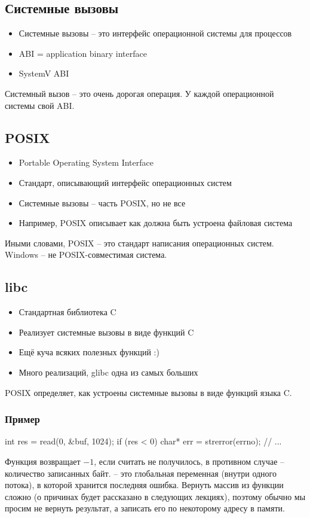     \subsection{Системные вызовы}
    \begin{itemize}
      \item Системные вызовы -- это интерфейс операционной системы для процессов
      \item ABI = application binary interface
      \item SystemV ABI
    \end{itemize}
    Системный вызов -- это очень дорогая операция. У каждой операционной системы свой ABI.
    
    \subsection{POSIX}
    \begin{itemize}
      \item Portable Operating System Interface
      \item Стандарт, описывающий интерфейс операционных систем
      \item Системные вызовы -- часть POSIX, но не все
      \item Например, POSIX описывает как должна быть устроена файловая система
    \end{itemize}
    Иными словами, POSIX -- это стандарт написания операционных систем. Windows -- не POSIX-совместимая система.
    
    \subsection{libc}
    \begin{itemize}
      \item Стандартная библиотека C
      \item Реализует системные вызовы в виде функций C
      \item Ещё куча всяких полезных функций :)
      \item Много реализаций, glibc одна из самых больших
    \end{itemize}
    POSIX определяет, как устроены системные вызовы в виде функций языка C.
    
    \subsubsection{Пример}
\begin{cminted}
int res = read(0, &buf, 1024);
if (res < 0) {
  char* err = strerror(errno);
  // ...
}
\end{cminted}
Функция  возвращает $-1$, если считать не получилось, в противном случае -- количество записанных байт. \newline
{} -- это глобальная переменная (внутри одного потока), в которой хранится последняя ошибка.\newline
Вернуть массив из функции сложно (о причинах будет рассказано в следующих лекциях), поэтому обычно мы просим не вернуть результат, а записать его по некоторому адресу в памяти.

